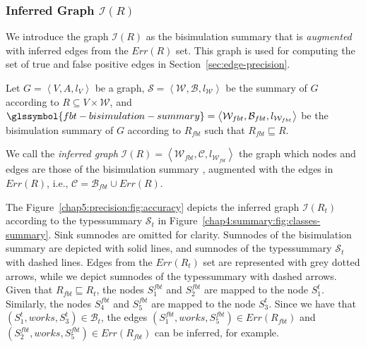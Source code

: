 \subsubsection{Inferred Graph $\mathcal{I}(R)$}

We introduce the graph $\mathcal{I}(R)$ as the bisimulation summary  that is \emph{augmented} with inferred edges from the $Err(R)$ set. This graph is used for computing the set of true and false positive edges in Section~\ref{sec:edge-precision}.

\begin{definition}
Let $G=\left\langle V, A, l_V \right\rangle$ be a graph, $\mathcal{S} = \left\langle \mathcal{W}, \mathcal{B}, l_{\mathcal{W}} \right\rangle$ be the summary of $G$ according to $R \subseteq V \times \mathcal{W}$, and $\glssymbol{fbt-bisimulation-summary} = \left\langle \mathcal{W}_{fbt}, \mathcal{B}_{fbt}, l_{\mathcal{W}_{fbt}} \right\rangle$ be the bisimulation summary of $G$ according to $R_{fbt}$ such that $R_{fbt} \sqsubseteq R$.

We call the \emph{inferred graph} $\mathcal{I}(R) = \left\langle \mathcal{W}_{fbt}, \mathcal{C}, l_{\mathcal{W}_{fbt}} \right\rangle$ the graph which nodes and edges are those of the bisimulation summary , augmented with the edges in $Err(R)$, i.e., $\mathcal{C} = \mathcal{B}_{fbt} \cup Err(R)$.
\end{definition}

The Figure~\ref{chap5:precision:fig:accuracy} depicts the inferred graph $\mathcal{I}(R_t)$ according to the \gls{typessummary} $\mathcal{S}_t$ in Figure~\ref{chap4:summary:fig:classes-summary}.
Sink sumnodes are omitted for clarity. Sumnodes of the bisimulation summary  are depicted with solid lines, and sumnodes of the \gls{typessummary} $\mathcal{S}_t$ with dashed lines. Edges from the $Err(R_t)$ set are represented with grey dotted arrows, while we depict sumnodes of the \gls{typessummary} with dashed arrows.\\

Given that $R_{fbt} \sqsubseteq R_t$, the nodes $S^{fbt}_1$ and $S^{fbt}_2$ are mapped to the node $S^t_1$. Similarly, the nodes $S^{fbt}_4$ and $S^{fbt}_5$ are mapped to the node $S^t_3$. Since we have that $(S^t_1, works, S^t_3) \in \mathcal{B}_t$, the edges $(S^{fbt}_1, works, S^{fbt}_5) \in Err(R_{fbt})$ and $(S^{fbt}_2, works, S^{fbt}_5) \in Err(R_{fbt})$ can be inferred, for example.

